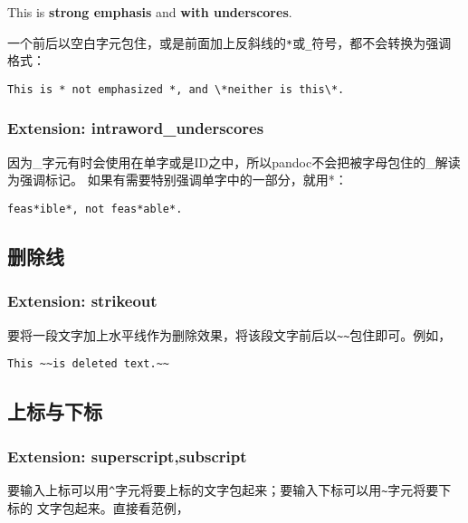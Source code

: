 \documentclass[fancyhdr,bookmark]{ctexbook}
\begin{document}
This is \textbf{strong emphasis} and \textbf{with underscores}.

一个前后以空白字元包住，或是前面加上反斜线的\lstinline!*!或\lstinline!_!符号，都不会转换为强调格式：

\begin{lstlisting}
This is * not emphasized *, and \*neither is this\*.
\end{lstlisting}

\subsubsection{Extension:
intraword\_underscores}\label{extension-intrawordux5funderscores}

因为\_字元有时会使用在单字或是ID之中，所以pandoc不会把被字母包住的\_解读为强调标记。
如果有需要特别强调单字中的一部分，就用*：

\begin{lstlisting}
feas*ible*, not feas*able*.
\end{lstlisting}

\subsection{删除线}\label{ux5220ux9664ux7ebf}

\subsubsection{Extension: strikeout}\label{extension-strikeout}

要将一段文字加上水平线作为删除效果，将该段文字前后以\lstinline!~~!包住即可。例如，

\begin{lstlisting}
This ~~is deleted text.~~
\end{lstlisting}

\subsection{上标与下标}\label{ux4e0aux6807ux4e0eux4e0bux6807}

\subsubsection{Extension:
superscript,subscript}\label{extension-superscriptsubscript}

要输入上标可以用\lstinline!^!字元将要上标的文字包起来；要输入下标可以用\lstinline!~!字元将要下标的
文字包起来。直接看范例，
\end{document}
